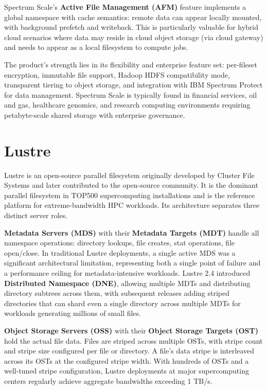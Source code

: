 Spectrum Scale's \textbf{Active File Management (AFM)} feature implements a global namespace with cache semantics: remote data can appear locally mounted, with background prefetch and writeback. This is particularly valuable for hybrid cloud scenarios where data may reside in cloud object storage (via cloud gateway) and needs to appear as a local filesystem to compute jobs.

The product's strength lies in its flexibility and enterprise feature set: per-fileset encryption, immutable file support, Hadoop HDFS compatibility mode, transparent tiering to object storage, and integration with IBM Spectrum Protect for data management. Spectrum Scale is typically found in financial services, oil and gas, healthcare genomics, and research computing environments requiring petabyte-scale shared storage with enterprise governance.

\section{Lustre}
Lustre is an open-source parallel filesystem originally developed by Cluster File Systems and later contributed to the open-source community. It is the dominant parallel filesystem in TOP500 supercomputing installations and is the reference platform for extreme-bandwidth HPC workloads. Its architecture separates three distinct server roles.

\textbf{Metadata Servers (MDS)} with their \textbf{Metadata Targets (MDT)} handle all namespace operations: directory lookups, file creates, stat operations, file open/close. In traditional Lustre deployments, a single active MDS was a significant architectural limitation, representing both a single point of failure and a performance ceiling for metadata-intensive workloads. Lustre 2.4 introduced \textbf{Distributed Namespace (DNE)}, allowing multiple MDTs and distributing directory subtrees across them, with subsequent releases adding striped directories that can shard even a single directory across multiple MDTs for workloads generating millions of small files.

\textbf{Object Storage Servers (OSS)} with their \textbf{Object Storage Targets (OST)} hold the actual file data. Files are striped across multiple OSTs, with stripe count and stripe size configured per file or directory. A file's data stripe is interleaved across its OSTs at the configured stripe width. With hundreds of OSTs and a well-tuned stripe configuration, Lustre deployments at major supercomputing centers regularly achieve aggregate bandwidths exceeding 1 TB/s.

